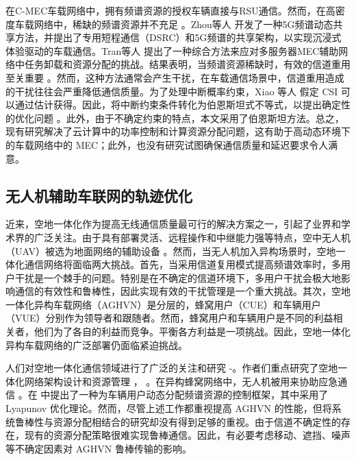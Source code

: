 在C-MEC车载网络中，拥有频谱资源的授权车辆直接与RSU通信。然而，在高密度车载网络中，稀缺的频谱资源并不充足 \cite{Xie2020}。Zhou等人 \cite{Zhou2017} 开发了一种5G频谱动态共享方法，并提出了专用短程通信（DSRC）和5G频谱的共享架构，以实现沉浸式体验驱动的车载通信。Tran等人 \cite{Tran2019} 提出了一种综合方法来应对多服务器MEC辅助网络中任务卸载和资源分配的挑战。结果表明，当频谱资源稀缺时，有效的信道重用至关重要 \cite{Liang2021}。然而，这种方法通常会产生干扰，在车载通信场景中，信道重用造成的干扰往往会严重降低通信质量。为了处理中断概率约束，Xiao 等人  \cite{Xiao2020} 假定 CSI 可以通过估计获得。因此，将中断约束条件转化为伯恩斯坦式不等式，以提出确定性的优化问题 \cite{Chen2022}。此外，由于不确定约束的特点，本文采用了伯恩斯坦方法。总之，现有研究解决了云计算中的功率控制和计算资源分配问题，这有助于高动态环境下的车载网络中的 MEC；此外，也没有研究试图确保通信质量和延迟要求令人满意。
\subsection{无人机辅助车联网的轨迹优化}\label{section1-2-2}
近来，空地一体化作为提高无线通信质量最可行的解决方案之一，引起了业界和学术界的广泛关注。由于具有部署灵活、远程操作和中继能力强等特点，空中无人机（UAV）被选为地面网络的辅助设备 \cite{ACO}。然而，当无人机加入异构场景时，空地一体化通信网络将面临两大挑战。首先，当采用信道复用模式提高频谱效率时，多用户干扰是一个棘手的问题。特别是在不确定的信道环境下，多用户干扰会极大地影响通信的有效性和鲁棒性，因此实现有效的干扰管理是一个重大挑战。其次，空地一体化异构车载网络（AGHVN）是分层的，蜂窝用户（CUE）和车辆用户（VUE）分别作为领导者和跟随者。然而，蜂窝用户和车辆用户是不同的利益相关者，他们为了各自的利益而竞争。平衡各方利益是一项挑战。因此，空地一体化异构车载网络的广泛部署仍面临紧迫挑战。

人们对空地一体化通信领域进行了广泛的关注和研究 \cite{OUC}-\cite{SDR}。作者们重点研究了空地一体化网络架构设计和资源管理 \cite{OUC}， \cite{OSI}。在异构蜂窝网络中，无人机被用来协助应急通信 \cite{DSF}。在 \cite{SDR}中提出了一种为车辆用户动态分配频谱资源的控制框架，其中采用了 Lyapunov 优化理论。然而，尽管上述工作都重视提高 AGHVN 的性能，但将系统鲁棒性与资源分配相结合的研究却没有得到足够的重视。由于信道不确定性的存在，现有的资源分配策略很难实现鲁棒通信。因此，有必要考虑移动、遮挡、噪声等不确定因素对 AGHVN 鲁棒传输的影响。

